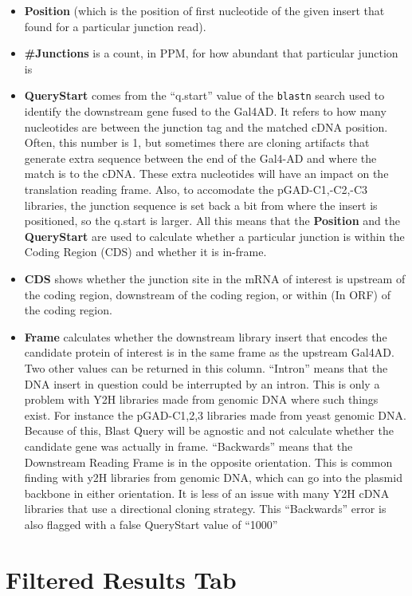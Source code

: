 \documentclass[11pt,fleqn]{book} %
\newcommand{\BlastQuery}{{\color{ForestGreen} Blast Query }}
\begin{document}
\begin{itemize}
    \item \textbf{Position} (which is the position of first nucleotide of the given insert that found for a particular junction read). 
    \item \textbf{\#Junctions} is a count, in PPM, for how abundant that particular junction is
    \item \textbf{QueryStart} comes from the ``q.start'' value of the \texttt{blastn} search used to identify the downstream gene fused to the Gal4AD.  It refers to how many nucleotides are between the junction tag and the matched cDNA position. Often, this number is 1, but sometimes there are cloning artifacts that generate extra sequence between the end of the Gal4-AD and where the match is to the cDNA.  These extra nucleotides will have an impact on the translation reading frame.  Also, to accomodate the pGAD-C1,-C2,-C3 libraries, the junction sequence is set back a bit from where the insert is positioned, so the q.start is larger. All this means that the \textbf{Position} and the \textbf{QueryStart} are used to calculate whether a particular junction is within the Coding Region (CDS) and whether it is in-frame.
    \item \textbf{CDS} shows whether the junction site in the mRNA of interest is upstream of the coding region, downstream of the coding region, or within (In ORF) of the coding region.
    \item \textbf{Frame} calculates whether the downstream library insert that encodes the candidate protein of interest is in the same frame as the upstream Gal4AD.  Two other values can be returned in this column.  ``Intron'' means that the DNA insert in question could be interrupted by an intron.  This is only a problem with Y2H libraries made from genomic DNA where such things exist.  For instance the pGAD-C1,2,3 libraries made from yeast genomic DNA.  Because of this, \BlastQuery will be agnostic and not calculate whether the candidate gene was actually in frame. ``Backwards'' means that the Downstream Reading Frame is in the opposite orientation.  This is common finding with y2H libraries from genomic DNA, which can go into the plasmid backbone in either orientation.  It is less of an issue with many Y2H cDNA libraries that use a directional cloning strategy.  This ``Backwards'' error is also flagged with a false QueryStart value of ``1000'' 
\end{itemize}

\section{Filtered Results Tab}
\end{document}
